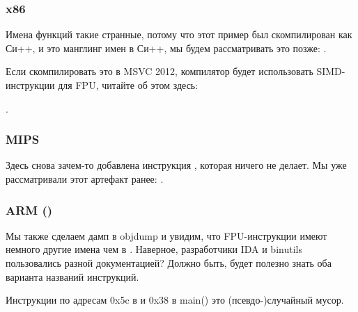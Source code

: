 \subsubsection{x86}



Имена функций такие странные, потому что этот пример был скомпилирован как Си++, и это манглинг имен в Си++, мы будем рассматривать это позже: .

Если скомпилировать это в MSVC 2012, компилятор будет использовать SIMD-инструкции для FPU, читайте об этом здесь:

.

\subsubsection{MIPS}



Здесь снова зачем-то добавлена инструкция , которая ничего не делает.
Мы уже рассматривали этот артефакт ранее: .

\subsubsection{ARM (\ARMMode)}



Мы также сделаем дамп в objdump и увидим, что FPU-инструкции имеют немного другие имена чем в \IDA.
Наверное, разработчики IDA и binutils пользовались разной документацией?
Должно быть, будет полезно знать оба варианта названий инструкций.



Инструкции по адресам 0x5c в  и 0x38 в main() это (псевдо-)случайный мусор.

